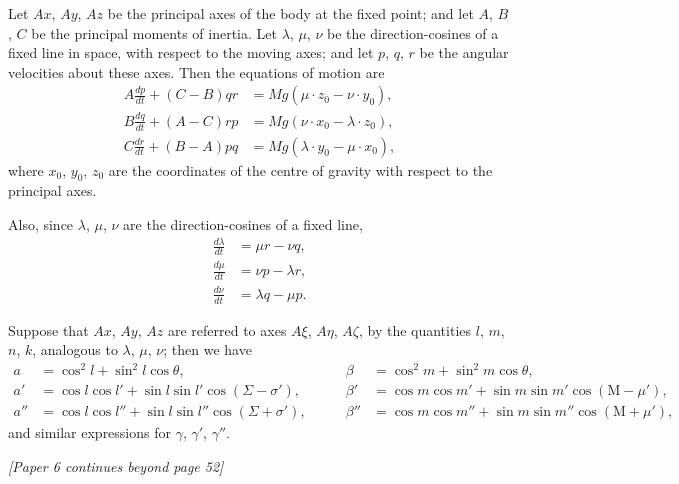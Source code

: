 \documentclass[11pt,a4paper]{book}
\theoremstyle{plain}
\theoremstyle{definition}
\theoremstyle{remark}
\begin{document}
Let $Ax$, $Ay$, $Az$ be the principal axes of the body at the fixed point; and let $A$, $B$, $C$ be the principal moments of inertia. Let $\lambda$, $\mu$, $\nu$ be the direction-cosines of a fixed line in space, with respect to the moving axes; and let $p$, $q$, $r$ be the angular velocities about these axes. Then the equations of motion are
\begin{align}
A \frac{dp}{dt} + (C - B)qr &= M g (\mu \cdot z_0 - \nu \cdot y_0), \\
B \frac{dq}{dt} + (A - C)rp &= M g (\nu \cdot x_0 - \lambda \cdot z_0), \\
C \frac{dr}{dt} + (B - A)pq &= M g (\lambda \cdot y_0 - \mu \cdot x_0),
\end{align}
where $x_0$, $y_0$, $z_0$ are the coordinates of the centre of gravity with respect to the principal axes.

Also, since $\lambda$, $\mu$, $\nu$ are the direction-cosines of a fixed line,
\begin{align}
\frac{d\lambda}{dt} &= \mu r - \nu q, \\
\frac{d\mu}{dt} &= \nu p - \lambda r, \\
\frac{d\nu}{dt} &= \lambda q - \mu p.
\end{align}

Suppose that $Ax$, $Ay$, $Az$ are referred to axes $A\xi$, $A\eta$, $A\zeta$, by the quantities $l$, $m$, $n$, $k$, analogous to $\lambda$, $\mu$, $\nu$; then we have
\[
\begin{aligned}
a &= \cos^2 l + \sin^2 l \cos \theta, \\
a' &= \cos l \cos l' + \sin l \sin l' \cos(\Sigma - \sigma'), \\
a'' &= \cos l \cos l'' + \sin l \sin l'' \cos(\Sigma + \sigma'),
\end{aligned}
\qquad
\begin{aligned}
\beta &= \cos^2 m + \sin^2 m \cos \theta, \\
\beta' &= \cos m \cos m' + \sin m \sin m' \cos(\mathrm{M} - \mu'), \\
\beta'' &= \cos m \cos m'' + \sin m \sin m'' \cos(\mathrm{M} + \mu'),
\end{aligned}
\]
and similar expressions for $\gamma$, $\gamma'$, $\gamma''$.

\vfill
\begin{center}
\textit{[Paper 6 continues beyond page 52]}
\end{center}

\cleardoublepage
\end{document}
